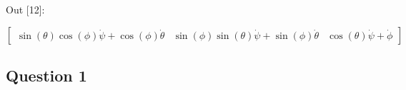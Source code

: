 \documentclass[11pt]{article}
\newif\ifleftmargins
\newlength{\promptlength}
\begin{document}
            \needspace{1.1cm}
\settowidth{\promptlength}{ Out [12] }
\ifleftmargins\hspace{-\promptlength}\hspace{-5pt}\fi
{\color{outcolor}Out [{\color{outcolor}12}]:}
\ifleftmargins\vspace{-2.7ex}\fi
    
    $$\left[\begin{matrix}\operatorname{sin}\left(\theta\right) \operatorname{cos}\left(\phi\right) \dot{\psi} + \operatorname{cos}\left(\phi\right) \dot{\theta} & \operatorname{sin}\left(\phi\right) \operatorname{sin}\left(\theta\right) \dot{\psi} + \operatorname{sin}\left(\phi\right) \dot{\theta} & \operatorname{cos}\left(\theta\right) \dot{\psi} + \dot{\phi}\end{matrix}\right]$$

    

    \hypertarget{question-1}{%
\subsection{Question 1}\label{question-1}}
\end{document}
